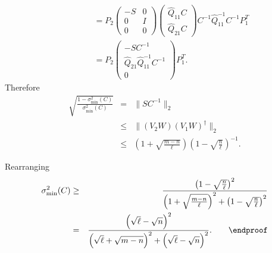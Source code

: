 \documentclass[final,leqno,onefignum,onetabnum]{siamltex1213}
\begin{document}
\begin{eqnarray}
&&\hspace{1cm}=P_2\left(\begin{array}{cc} -S & 0 \\ 0 & I \\ 0 & 0\end{array}\right)\left(\begin{array}{c}\widehat{Q}_{11}C \\ \widehat{Q}_{21}C\end{array}\right)C^{-1}\widehat{Q}_{11}^{-1}C^{-1}P_1^T\nonumber\\
&&\hspace{1cm}=P_2\left(\begin{array}{c} -SC^{-1} \\ \widehat{Q}_{21}\widehat{Q}_{11}^{-1}C^{-1} \\ 0\end{array}\right)P_1^T.\nonumber
\end{eqnarray}
\normalsize
Therefore
\begin{eqnarray}
\sqrt{\frac{1-\sigma_{\min}^2(C)}{\sigma_{\min}^2(C)}}&=&\|SC^{-1}\|_2\nonumber\\
&\le&\|\left(V_2W\right)\left(V_1W\right)^\dagger\|_2\nonumber\\
&\le&\left(1+\sqrt{\frac{m-n}{\ell}}\right)\left(1-\sqrt{\frac{n}{\ell}}\right)^{-1}.\nonumber
\end{eqnarray}

Rearranging
\begin{eqnarray}
\sigma_{\min}^2(C)&\ge&\frac{\left(1-\sqrt{\frac{n}{\ell}}\right)^2}{\left(1+\sqrt{\frac{m-n}{\ell}}\right)^2+\left(1-\sqrt{\frac{n}{\ell}}\right)^2}\nonumber\\
&=&\frac{\left(\sqrt{\ell}-\sqrt{n}\right)^2}{\left(\sqrt{\ell}+\sqrt{m-n}\right)^2+\left(\sqrt{\ell}-\sqrt{n}\right)^2}.\hspace{2 em}\endproof\nonumber
\end{eqnarray}
\end{document}
